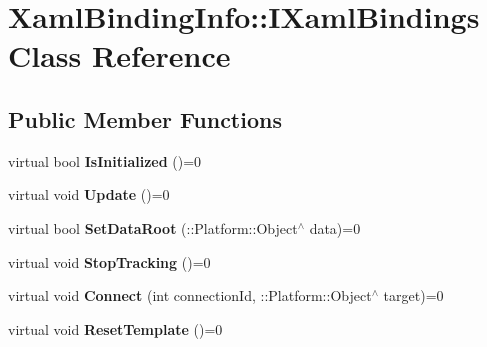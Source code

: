 \hypertarget{class_xaml_binding_info_1_1_i_xaml_bindings}{}\section{Xaml\+Binding\+Info\+:\+:I\+Xaml\+Bindings Class Reference}
\label{class_xaml_binding_info_1_1_i_xaml_bindings}
\subsection*{Public Member Functions}
\begin{DoxyCompactItemize}
\item 
\mbox{\label{class_xaml_binding_info_1_1_i_xaml_bindings_a84ac9cebecf96c2c7ccfaeb43e9d4252}} 
virtual bool {\bfseries Is\+Initialized} ()=0
\item 
\mbox{\label{class_xaml_binding_info_1_1_i_xaml_bindings_af7bbb67de71bfaedbf116df6d689f22b}} 
virtual void {\bfseries Update} ()=0
\item 
\mbox{\label{class_xaml_binding_info_1_1_i_xaml_bindings_a35a0a9b1922e3c719c26791bdc0a102e}} 
virtual bool {\bfseries Set\+Data\+Root} (\+::Platform\+::\+Object$^\wedge$ data)=0
\item 
\mbox{\label{class_xaml_binding_info_1_1_i_xaml_bindings_abbffa5e36a4cc1ef3b7e14814112480a}} 
virtual void {\bfseries Stop\+Tracking} ()=0
\item 
\mbox{\label{class_xaml_binding_info_1_1_i_xaml_bindings_a9e14f106ac9c9a8fef1203dc34619865}} 
virtual void {\bfseries Connect} (int connection\+Id, \+::Platform\+::\+Object$^\wedge$ target)=0
\item 
\mbox{\label{class_xaml_binding_info_1_1_i_xaml_bindings_a38efcb61569708b5807d32478b66b6be}} 
virtual void {\bfseries Reset\+Template} ()=0
\item 
\mbox{\label{class_xaml_binding_info_1_1_i_xaml_bindings_a9a6d53b4fae9f58a529b914e60f6a6b1}} 

\end{DoxyCompactItemize}
